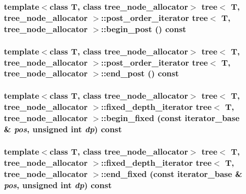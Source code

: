 \hypertarget{classtree_73c673d39fe46db7ca4e1533841cdbc0}{
\subsubsection{\setlength{\rightskip}{0pt plus 5cm}template$<$class T, class tree\_\-node\_\-allocator$>$ {\bf tree}$<$ T, tree\_\-node\_\-allocator $>$::{\bf post\_\-order\_\-iterator} {\bf tree}$<$ T, tree\_\-node\_\-allocator $>$::begin\_\-post () const}}
\label{classtree_73c673d39fe46db7ca4e1533841cdbc0}


\hypertarget{classtree_d339ab550fc2718e84506e91960a177f}{
\subsubsection{\setlength{\rightskip}{0pt plus 5cm}template$<$class T, class tree\_\-node\_\-allocator$>$ {\bf tree}$<$ T, tree\_\-node\_\-allocator $>$::{\bf post\_\-order\_\-iterator} {\bf tree}$<$ T, tree\_\-node\_\-allocator $>$::end\_\-post () const}}
\label{classtree_d339ab550fc2718e84506e91960a177f}


\hypertarget{classtree_3e7ee34b9582cb6f0bd5b25f501a1057}{
\subsubsection{\setlength{\rightskip}{0pt plus 5cm}template$<$class T, class tree\_\-node\_\-allocator$>$ {\bf tree}$<$ T, tree\_\-node\_\-allocator $>$::{\bf fixed\_\-depth\_\-iterator} {\bf tree}$<$ T, tree\_\-node\_\-allocator $>$::begin\_\-fixed (const {\bf iterator\_\-base} \& {\em pos}, \/  unsigned int {\em dp}) const}}
\label{classtree_3e7ee34b9582cb6f0bd5b25f501a1057}


\hypertarget{classtree_bab26c0edd25cc836ed768e32c034165}{
\subsubsection{\setlength{\rightskip}{0pt plus 5cm}template$<$class T, class tree\_\-node\_\-allocator$>$ {\bf tree}$<$ T, tree\_\-node\_\-allocator $>$::{\bf fixed\_\-depth\_\-iterator} {\bf tree}$<$ T, tree\_\-node\_\-allocator $>$::end\_\-fixed (const {\bf iterator\_\-base} \& {\em pos}, \/  unsigned int {\em dp}) const}}
\label{classtree_bab26c0edd25cc836ed768e32c034165}


